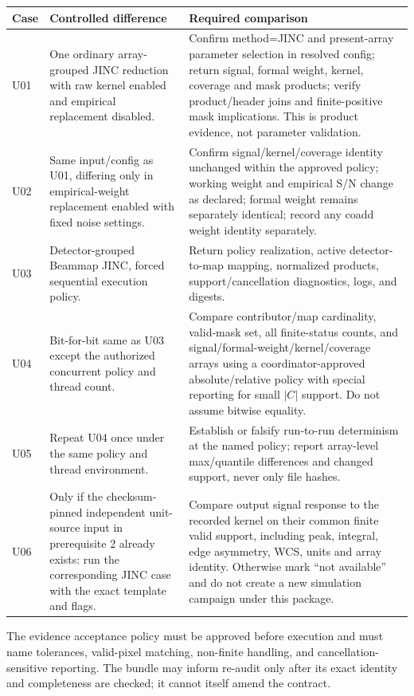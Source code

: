 \documentclass[10pt]{article}
\begin{document}
\begin{longtable}{@{}p{}p{}p{}@{}}
\toprule
Case & Controlled difference & Required comparison \\
\midrule
\endhead
U01 & One ordinary array-grouped JINC reduction with raw kernel enabled and
empirical replacement disabled. & Confirm method=JINC and present-array
parameter selection in resolved config; return signal, formal weight, kernel,
coverage and mask products; verify product/header joins and finite-positive
mask implications.  This is product evidence, not parameter validation. \\
U02 & Same input/config as U01, differing only in empirical-weight replacement
enabled with fixed noise settings. & Confirm signal/kernel/coverage identity
unchanged within the approved policy; working weight and empirical S/N change
as declared; formal weight remains separately identical; record any coadd
weight identity separately. \\
U03 & Detector-grouped Beammap JINC, forced sequential execution policy. &
Return policy realization, active detector-to-map mapping, normalized products,
support/cancellation diagnostics, logs, and digests. \\
U04 & Bit-for-bit same as U03 except the authorized concurrent policy and
thread count. & Compare contributor/map cardinality, valid-mask set, all
finite-status counts, and signal/formal-weight/kernel/coverage arrays using a
coordinator-approved absolute/relative policy with special reporting for
small $|C|$ support.  Do not assume bitwise equality. \\
U05 & Repeat U04 once under the same policy and thread environment. & Establish
or falsify run-to-run determinism at the named policy; report array-level
max/quantile differences and changed support, never only file hashes. \\
U06 & Only if the checksum-pinned independent unit-source input in prerequisite
2 already exists: run the corresponding JINC case with the exact template and
flags. & Compare output signal response to the recorded kernel on their common
finite valid support, including peak, integral, edge asymmetry, WCS, units and
array identity.  Otherwise mark ``not available'' and do not create a new
simulation campaign under this package. \\
\bottomrule
\end{longtable}

The evidence acceptance policy must be approved before execution and must
name tolerances, valid-pixel matching, non-finite handling, and cancellation-
sensitive reporting.  The bundle may inform re-audit only after its exact
identity and completeness are checked; it cannot itself amend the contract.
\end{document}
